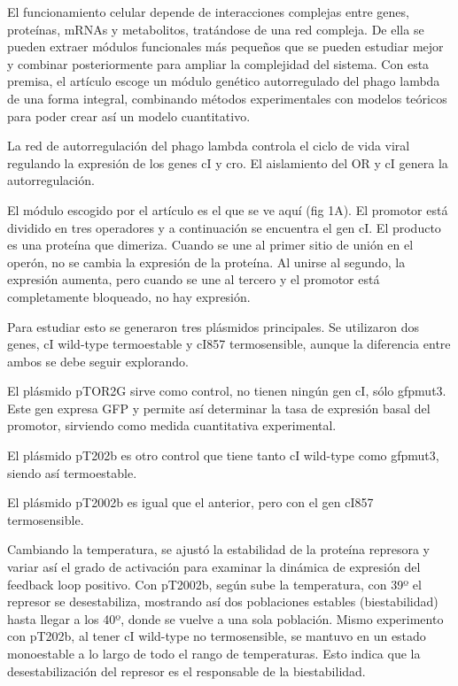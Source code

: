 El funcionamiento celular depende de interacciones complejas entre genes, proteínas, mRNAs y metabolitos, tratándose de una red compleja. De ella se pueden extraer módulos funcionales más pequeños que se pueden estudiar mejor y combinar posteriormente para ampliar la complejidad del sistema. 
Con esta premisa, el artículo escoge un módulo genético autorregulado del phago lambda de una forma integral, combinando métodos experimentales con modelos teóricos para poder crear así un modelo cuantitativo.

La red de autorregulación del phago lambda controla el ciclo de vida viral regulando la expresión de los genes cI y cro. El aislamiento del OR y cI genera la autorregulación.

El módulo escogido por el artículo es el que se ve aquí (fig 1A). El promotor está dividido en tres operadores y a continuación se encuentra el gen cI. El producto es una proteína que dimeriza. Cuando se une al primer sitio de unión en el operón, no se cambia la expresión de la proteína. Al unirse al segundo, la expresión aumenta, pero cuando se une al tercero y el promotor está completamente bloqueado, no hay expresión.

Para estudiar esto se generaron tres plásmidos principales. Se utilizaron dos genes, cI wild-type termoestable y cI857 termosensible, aunque la diferencia entre ambos se debe seguir explorando.

El plásmido pTOR2G sirve como control, no tienen ningún gen cI, sólo gfpmut3. Este gen expresa GFP y permite así determinar la tasa de expresión basal del promotor, sirviendo como medida cuantitativa experimental.

El plásmido pT202b es otro control que tiene tanto cI wild-type como gfpmut3, siendo así termoestable. 

El plásmido pT2002b es igual que el anterior, pero con el gen cI857 termosensible.


Cambiando la temperatura, se ajustó la estabilidad de la proteína represora y variar así el grado de activación para examinar la dinámica de expresión del feedback loop positivo. 
Con pT2002b, según sube la temperatura, con 39º el represor se desestabiliza, mostrando así dos poblaciones estables (biestabilidad) hasta llegar a los 40º, donde se vuelve a una sola población.
Mismo experimento con pT202b, al tener cI wild-type no termosensible, se mantuvo en un estado monoestable a lo largo de todo el rango de temperaturas. Esto indica que la desestabilización del represor es el responsable de la biestabilidad. 


